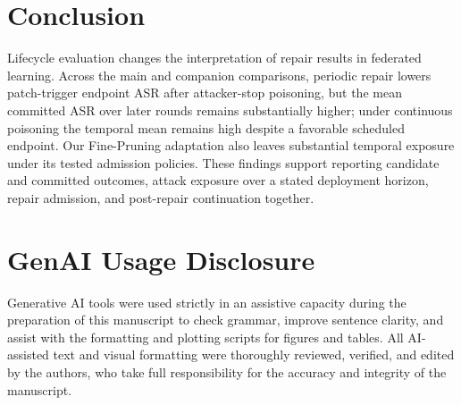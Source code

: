 \documentclass[sigconf,review,anonymous]{acmart}
\begin{document}
\section{Conclusion}
Lifecycle evaluation changes the interpretation of repair results in federated learning. Across the main and companion comparisons, periodic repair lowers patch-trigger endpoint ASR after attacker-stop poisoning, but the mean committed ASR over later rounds remains substantially higher; under continuous poisoning the temporal mean remains high despite a favorable scheduled endpoint. Our Fine-Pruning adaptation also leaves substantial temporal exposure under its tested admission policies. These findings support reporting candidate and committed outcomes, attack exposure over a stated deployment horizon, repair admission, and post-repair continuation together.

\balance
\section*{GenAI Usage Disclosure}
Generative AI tools were used strictly in an assistive capacity during the preparation of this manuscript to check grammar, improve sentence clarity, and assist with the formatting and plotting scripts for figures and tables. All AI-assisted text and visual formatting were thoroughly reviewed, verified, and edited by the authors, who take full responsibility for the accuracy and integrity of the manuscript.



\end{document}
